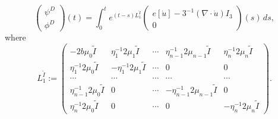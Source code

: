 \documentclass[a4paper,12pt]{article}
\newtheorem{a priori condition}[Th]{A priori condition}
\begin{document}
\begin{equation}\label{s2.10}
\begin{pmatrix}
\psi^D \\
\phi^D
\end{pmatrix}
(t)=\int_0^t e^{(t-s)L_1^{\tilde I}}
\begin{pmatrix}
e[\dot{u}]-3^{-1}(\nabla\cdot\dot{u}) I_3 \\
0
\end{pmatrix}
(s)\, ds,
\end{equation}
where
\begin{equation}\label{s2.11}
L_1^{\tilde I}:=
\begin{pmatrix}
                       -2b\mu_0\tilde I
                       & \eta_1^{-1}2\mu_1 \tilde I & \cdots     & \eta_{n-1}^{-1}2\mu_{n-1}  \tilde I          &    \eta_n^{-1}2\mu_n \tilde I   \\

                             \eta_1^{-1}2\mu_0  \tilde I                            & -\eta_1^{-1}2\mu_1 \tilde I& \cdots     &    0               &            0         \\
            \cdots                                   & \cdots                   & \cdots     & \cdots             & \cdots               \\
                               \eta_{n-1}^{-1}2\mu_0    \tilde I                           & 0              & \cdots     & -\eta_{n-1}^{-1}2\mu_{n-1}   \tilde I  &            0         \\
                              \eta_n^{-1}2\mu_0      \tilde I                        & 0              & \cdots     &    0               &    -\eta_n^{-1}2\mu_n \tilde I
\end{pmatrix}.
\end{equation}
\end{document}
